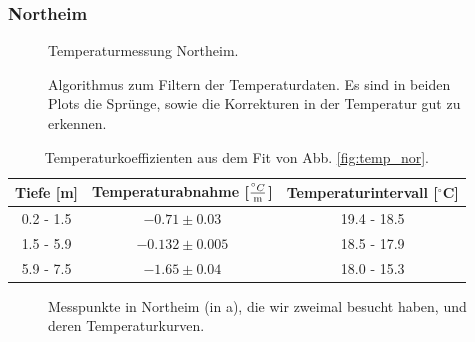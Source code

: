 \documentclass[12pt,a4paper,titlepage,headinclude,bibtotoc]{scrartcl}
\numberwithin{equation}{subsection}
\begin{document}
\subsubsection{Northeim}
\label{sec:austempnortheim}
\begin{figure}[!htb]
	\centering
	\hfill
	\caption{Temperaturmessung Northeim.}
	\label{fig:temp_Nord}
\end{figure}
\begin{figure}[!h]
	\centering
   \hfill
	\caption{Algorithmus zum Filtern der Temperaturdaten. Es sind in beiden Plots die Sprünge, sowie die Korrekturen in der Temperatur gut zu erkennen.}
	\label{fig:tempAlg}
\end{figure}
\begin{table}[!htb]
\centering
\begin{tabular}{|c||c|c|}
\hline
Tiefe [m] & Temperaturabnahme [$\frac{^\circ C}{\text m}$] & Temperaturintervall [$^\circ$C]\\\hline\hline
0.2 - 1.5 & $-0.71\pm  0.03$	& 19.4 - 18.5 \\
1.5 - 5.9 & $-0.132\pm 0.005$	& 18.5 - 17.9 \\
5.9 - 7.5 & $-1.65\pm 0.04$	& 18.0 - 15.3 \\\hline
\end{tabular}
\caption{Temperaturkoeffizienten aus dem Fit von Abb. \ref{fig:temp_nor}.}
\label{tab:tempTabNor}
\end{table}
\begin{figure}[!htb]
	\centering
   \hfill
   \hfill
   \hfill
	\caption{Messpunkte in Northeim (in a), die wir zweimal besucht haben, und deren Temperaturkurven.}
	\label{fig:tempNort2}
\end{figure}
\end{document}
